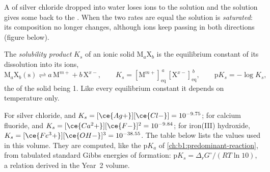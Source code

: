 A  of silver chloride dropped into water loses ions to the
solution and the solution gives some back to the . When the two
rates are equal the solution is \emph{saturated}: its composition no longer
changes, although ions keep passing in both directions
(figure below).

\begin{definition}\label{def:b1:precipitation:solubility-product}
The \emph{solubility product} $K_s$ of an ionic
solid $\mathrm{M}_a\mathrm{X}_b$ is the equilibrium constant of its
dissolution into its ions,
\[
  \mathrm{M}_a\mathrm{X}_b\mathrm{(s)} \rightleftharpoons a\,\mathrm{M}^{m+}
  + b\,\mathrm{X}^{x-}, \qquad
  K_s = [\mathrm{M}^{m+}]_{\mathrm{eq}}^{\,a}\,[\mathrm{X}^{x-}]_{\mathrm{eq}}^{\,b},
  \qquad \mathrm{p}K_s = -\log K_s ,
\]
the  of the solid being 1. Like every equilibrium constant it
depends on temperature only.
\end{definition}

For silver chloride,  and $K_s =
[\ce{Ag+}][\ce{Cl-}] = 10^{-9.75}$; for calcium fluoride,  and $K_s = [\ce{Ca^2+}][\ce{F-}]^2 = 10^{-9.84}$; for
iron(III) hydroxide, $K_s = [\ce{Fe^3+}][\ce{OH-}]^3 = 10^{-38.55}$.
The table below lists the values used in this volume.
They are computed, like the $\mathrm{p}K_a$ of
\cref{ch:b1:predominant-reaction}, from tabulated standard Gibbs energies
of formation: $\mathrm{p}K_s = \Delta_r G^\circ/(RT\ln 10)$, a relation
derived in the Year~2 volume.

